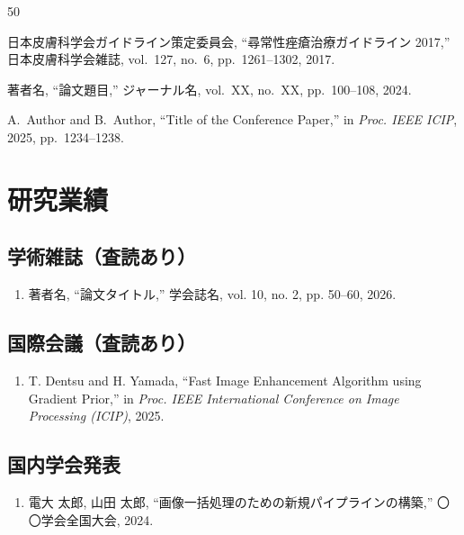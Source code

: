 \documentclass[book,paper=a4,fontsize=16pt,openany]{jlreq}
\begin{document}

\begin{thebibliography}{50}  %

日本皮膚科学会ガイドライン策定委員会, ``尋常性痤瘡治療ガイドライン 2017,'' 日本皮膚科学会雑誌, vol.~127, no.~6, pp.~1261--1302, 2017.

著者名, ``論文題目,'' ジャーナル名, vol.~XX, no.~XX, pp.~100--108, 2024.

A.~Author and B.~Author, ``Title of the Conference Paper,'' in \textit{Proc. IEEE ICIP}, 2025, pp.~1234--1238.

\end{thebibliography}        %

\chapter{研究業績}

\section*{学術雑誌（査読あり）}
\begin{enumerate}
    \item 著者名, ``論文タイトル,'' 学会誌名, vol. 10, no. 2, pp. 50--60, 2026.
\end{enumerate}

\section*{国際会議（査読あり）}
\begin{enumerate}
    \item T. Dentsu and H. Yamada, ``Fast Image Enhancement Algorithm using Gradient Prior,'' in \textit{Proc. IEEE International Conference on Image Processing (ICIP)}, 2025.
\end{enumerate}

\section*{国内学会発表}
\begin{enumerate}
    \item 電大 太郎, 山田 太郎, ``画像一括処理のための新規パイプラインの構築,'' 〇〇学会全国大会, 2024.
\end{enumerate}
\end{document}

